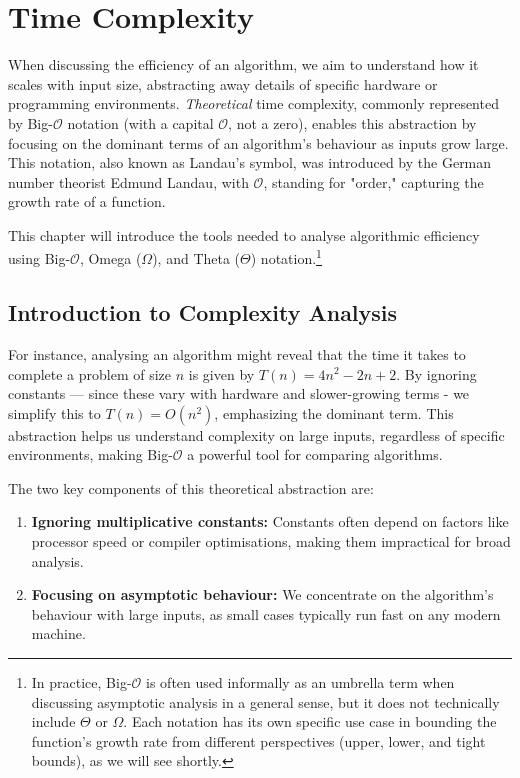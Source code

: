 \chapter{Time Complexity}\label{chap:ch10}

When discussing the efficiency of an algorithm, we aim to understand how it scales with input size, abstracting away details of specific hardware or programming environments. \textit{Theoretical} time complexity, commonly represented by Big-$\mathcal{O}$ notation (with a capital $\mathcal{O}$, not a zero), enables this abstraction by focusing on the dominant terms of an algorithm's behaviour as inputs grow large. This notation, also known as Landau's symbol, was introduced by the German number theorist Edmund Landau, with $\mathcal{O}$, standing for "order," capturing the growth rate of a function.

This chapter will introduce the tools needed to analyse algorithmic efficiency using Big-$\mathcal{O}$, Omega ($\Omega$), and Theta ($\Theta$) notation.\footnote{In practice, Big-$\mathcal{O}$ is often used informally as an umbrella term when discussing asymptotic analysis in a general sense, but it does not technically include $\Theta$ or $\Omega$. Each notation has its own specific use case in bounding the function's growth rate from different perspectives (upper, lower, and tight bounds), as we will see shortly.}

\section{Introduction to Complexity Analysis}\label{sec:ch10sec1}

For instance, analysing an algorithm might reveal that the time it takes to complete a problem of size $n$ is given by $T(n)=4 n^2-2 n+2$. By ignoring constants — since these vary with hardware and slower-growing terms - we simplify this to $T(n)=O\left(n^2\right)$, emphasizing the dominant term. This abstraction helps us understand complexity on large inputs, regardless of specific environments, making Big-$\mathcal{O}$ a powerful tool for comparing algorithms.

The two key components of this theoretical abstraction are:

\begin{enumerate}
    \item \textbf{Ignoring multiplicative constants:} Constants often depend on factors like processor speed or compiler optimisations, making them impractical for broad analysis.
    \item \textbf{Focusing on asymptotic behaviour:} We concentrate on the algorithm's behaviour with large inputs, as small cases typically run fast on any modern machine.
\end{enumerate}

